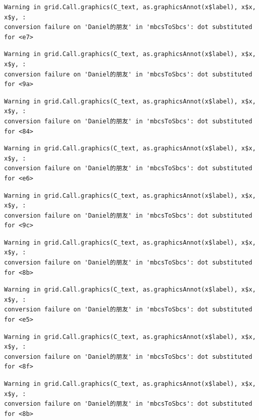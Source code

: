 \documentclass[
  letterpaper,
  DIV=11,
  numbers=noendperiod]{scrreprt}
\begin{document}
\begin{verbatim}
Warning in grid.Call.graphics(C_text, as.graphicsAnnot(x$label), x$x, x$y, :
conversion failure on 'Daniel的朋友' in 'mbcsToSbcs': dot substituted for <e7>
\end{verbatim}

\begin{verbatim}
Warning in grid.Call.graphics(C_text, as.graphicsAnnot(x$label), x$x, x$y, :
conversion failure on 'Daniel的朋友' in 'mbcsToSbcs': dot substituted for <9a>
\end{verbatim}

\begin{verbatim}
Warning in grid.Call.graphics(C_text, as.graphicsAnnot(x$label), x$x, x$y, :
conversion failure on 'Daniel的朋友' in 'mbcsToSbcs': dot substituted for <84>
\end{verbatim}

\begin{verbatim}
Warning in grid.Call.graphics(C_text, as.graphicsAnnot(x$label), x$x, x$y, :
conversion failure on 'Daniel的朋友' in 'mbcsToSbcs': dot substituted for <e6>
\end{verbatim}

\begin{verbatim}
Warning in grid.Call.graphics(C_text, as.graphicsAnnot(x$label), x$x, x$y, :
conversion failure on 'Daniel的朋友' in 'mbcsToSbcs': dot substituted for <9c>
\end{verbatim}

\begin{verbatim}
Warning in grid.Call.graphics(C_text, as.graphicsAnnot(x$label), x$x, x$y, :
conversion failure on 'Daniel的朋友' in 'mbcsToSbcs': dot substituted for <8b>
\end{verbatim}

\begin{verbatim}
Warning in grid.Call.graphics(C_text, as.graphicsAnnot(x$label), x$x, x$y, :
conversion failure on 'Daniel的朋友' in 'mbcsToSbcs': dot substituted for <e5>
\end{verbatim}

\begin{verbatim}
Warning in grid.Call.graphics(C_text, as.graphicsAnnot(x$label), x$x, x$y, :
conversion failure on 'Daniel的朋友' in 'mbcsToSbcs': dot substituted for <8f>
\end{verbatim}

\begin{verbatim}
Warning in grid.Call.graphics(C_text, as.graphicsAnnot(x$label), x$x, x$y, :
conversion failure on 'Daniel的朋友' in 'mbcsToSbcs': dot substituted for <8b>
\end{verbatim}
\end{document}
